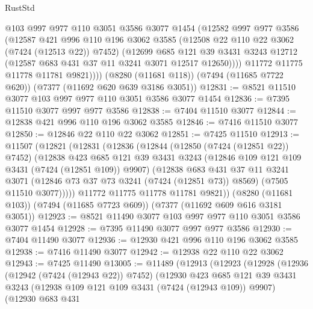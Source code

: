 \begin{lexlean}{RustStd}
\begin{coremodule}
{\begin{coremodule}
{{{{{{{{{{{{{{{{{{{{{{{{{{{{{{{{            @103
            @997
            @977
            @110
            @3051
            @3586
            @3077
            @1454
            (@12582
              @997
              @977
              @3586
              (@12587
                @421
                @996
                @110
                @196
                @3062
                @3585
                (@12508 @22 @110 @22 @3062 (@7424 (@12513 @22)) @7452)
                (@12699
                  @685
                  @121
                  @39
                  @3431
                  @3243
                  @12712
                  (@12587 @683 @431 @37 @11 @3241 @3071 @12517 @12650))))
            @11772
            @11775
            @11778
            @11781
            @9821))))
    (@8280 (@11681 @118))
    (@7494 (@11685 @7722 @620))
    (@7377 (@11692 @620 @639 @3186 @3051))
@12831 := @8521 @11510 @3077 @103 @997 @977 @110 @3051 @3586 @3077 @1454
@12836 := @7395 @11510 @3077 @997 @977 @3586
@12838 := @7404 @11510 @3077
@12844 := @12838 @421 @996 @110 @196 @3062 @3585
@12846 := @7416 @11510 @3077
@12850 := @12846 @22 @110 @22 @3062
@12851 := @7425 @11510
@12913 := @11507
    (@12821
      (@12831
        (@12836
          (@12844
            (@12850 (@7424 (@12851 @22)) @7452)
            (@12838
              @423
              @685
              @121
              @39
              @3431
              @3243
              (@12846 @109 @121 @109 @3431 (@7424 (@12851 @109)) @9907)
              (@12838
                @683
                @431
                @37
                @11
                @3241
                @3071
                (@12846 @73 @37 @73 @3241 (@7424 (@12851 @73)) @8569)
                (@7505 @11510 @3077)))))
        @11772
        @11775
        @11778
        @11781
        @9821))
    (@8280 (@11681 @103))
    (@7494 (@11685 @7723 @609))
    (@7377 (@11692 @609 @616 @3181 @3051))
@12923 := @8521 @11490 @3077 @103 @997 @977 @110 @3051 @3586 @3077 @1454
@12928 := @7395 @11490 @3077 @997 @977 @3586
@12930 := @7404 @11490 @3077
@12936 := @12930 @421 @996 @110 @196 @3062 @3585
@12938 := @7416 @11490 @3077
@12942 := @12938 @22 @110 @22 @3062
@12943 := @7425 @11490
@13005 := @11489
    (@12913
      (@12923
        (@12928
          (@12936
            (@12942 (@7424 (@12943 @22)) @7452)
            (@12930
              @423
              @685
              @121
              @39
              @3431
              @3243
              (@12938 @109 @121 @109 @3431 (@7424 (@12943 @109)) @9907)
              (@12930
                @683
                @431
}}}}}}}}}}}}}}}}}}}}}}}}}}}}}}}}
\end{coremodule}}
\end{coremodule}
\end{lexlean}
